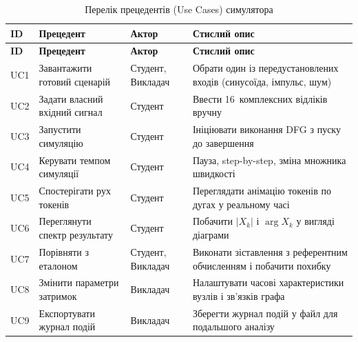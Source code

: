 \begin{longtable}[]{@{}
  >{\raggedright\arraybackslash}p{}
  >{\raggedright\arraybackslash}p{}
  >{\raggedright\arraybackslash}p{}
  >{\raggedright\arraybackslash}p{}@{}}
\caption[Перелік прецедентів (Use Cases) симулятора]{Перелік прецедентів
(Use Cases) симулятора}\tabularnewline
\toprule\noalign{}
\begin{minipage}[b]{\linewidth}\raggedright
\textbf{ID}
\end{minipage} & \begin{minipage}[b]{\linewidth}\raggedright
\textbf{Прецедент}
\end{minipage} & \begin{minipage}[b]{\linewidth}\raggedright
\textbf{Актор}
\end{minipage} & \begin{minipage}[b]{\linewidth}\raggedright
\textbf{Стислий опис}
\end{minipage} \\
\midrule\noalign{}
\endfirsthead
\toprule\noalign{}
\begin{minipage}[b]{\linewidth}\raggedright
\textbf{ID}
\end{minipage} & \begin{minipage}[b]{\linewidth}\raggedright
\textbf{Прецедент}
\end{minipage} & \begin{minipage}[b]{\linewidth}\raggedright
\textbf{Актор}
\end{minipage} & \begin{minipage}[b]{\linewidth}\raggedright
\textbf{Стислий опис}
\end{minipage} \\
\midrule\noalign{}
\endhead
\bottomrule\noalign{}
\endlastfoot
UC1 & Завантажити готовий сценарій & Студент, Викладач & Обрати один із
передустановлених входів (синусоїда, імпульс, шум) \\
UC2 & Задати власний вхідний сигнал & Студент & Ввести 16~комплексних
відліків вручну \\
UC3 & Запустити симуляцію & Студент & Ініціювати виконання DFG з пуску
до завершення \\
UC4 & Керувати темпом симуляції & Студент & Пауза, step-by-step, зміна
множника швидкості \\
UC5 & Спостерігати рух токенів & Студент & Переглядати анімацію токенів
по дугах у реальному часі \\
UC6 & Переглянути спектр результату & Студент & Побачити \(|X_{k}|\) і
\(\arg X_{k}\) у вигляді діаграми \\
UC7 & Порівняти з еталоном & Студент, Викладач & Виконати зіставлення з
референтним обчисленням і побачити похибку \\
UC8 & Змінити параметри затримок & Викладач & Налаштувати часові
характеристики вузлів і зв'язків графа \\
UC9 & Експортувати журнал подій & Викладач & Зберегти журнал подій у
файл для подальшого аналізу \\
\end{longtable}


